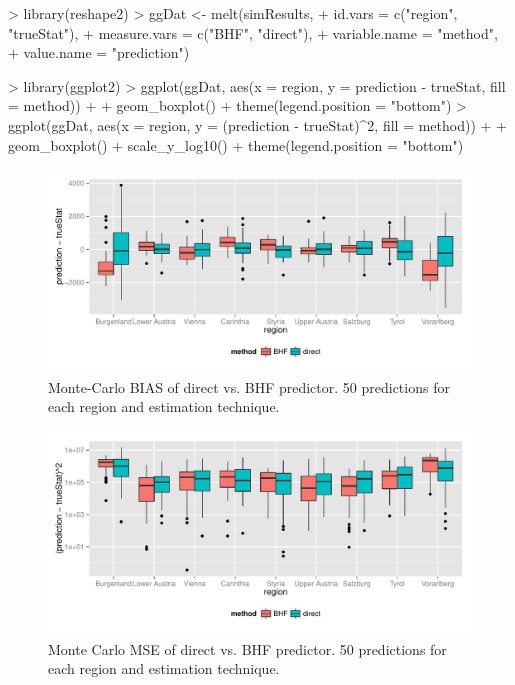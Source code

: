 \documentclass[article]{ajs}
\begin{document}
\begin{Schunk}
\begin{Sinput}
> library(reshape2)
> ggDat <- melt(simResults,
+               id.vars = c("region", "trueStat"), 
+               measure.vars = c("BHF", "direct"), 
+               variable.name = "method",
+               value.name = "prediction")
\end{Sinput}
\end{Schunk}

\begin{Schunk}
\begin{Sinput}
> library(ggplot2)
> ggplot(ggDat, aes(x = region, y = prediction - trueStat, fill = method)) + 
+   geom_boxplot() + theme(legend.position = "bottom")
> ggplot(ggDat, aes(x = region, y = (prediction - trueStat)^2, fill = method)) + 
+   geom_boxplot() + scale_y_log10() + theme(legend.position = "bottom")
\end{Sinput}
\end{Schunk}


\begin{figure}[!h]
\includegraphics[width = \textwidth]{saeSim-designSimBIAS.pdf}
\caption{Monte-Carlo BIAS of direct vs. BHF predictor. 50 predictions for each region and estimation technique.}
\label{fig:dbBIAS}
\end{figure}



\begin{figure}[!h]
\includegraphics[width = \textwidth]{saeSim-designSimMSE.pdf}
\caption{Monte Carlo MSE of direct vs. BHF predictor. 50 predictions for each region and estimation technique.}
\label{fig:dbMSE}
\end{figure}
\clearpage
\end{document}
